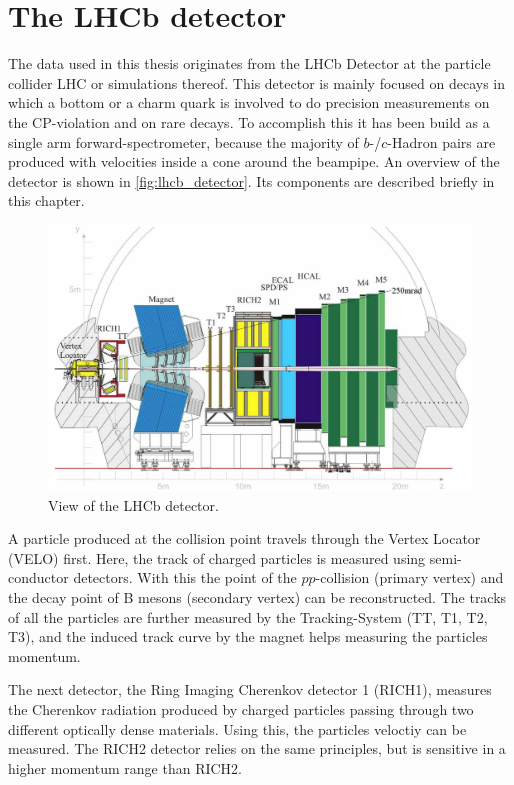 \section{The LHCb detector}

The data used in this thesis originates from the LHCb Detector at the particle collider LHC or simulations thereof.
This detector is mainly focused on decays in which a bottom or a charm quark is involved to do precision measurements on the CP-violation and on rare decays. 
To accomplish this it has been build as a single arm forward-spectrometer, because the majority of $b$-/$c$-Hadron pairs are produced with velocities inside a cone around the beampipe.
An overview of the detector is shown in \autoref{fig:lhcb_detector}.
Its components are described briefly in this chapter.

\begin{figure}
    \centering
    \includegraphics[width=\textwidth]{images/lhcb_detector.png}
    \caption{View of the LHCb detector. \cite{lhcb_detector}}
    \label{fig:lhcb_detector}
\end{figure}

A particle produced at the collision point travels through the Vertex Locator (VELO) first. 
Here, the track of charged particles is measured using semi-conductor detectors. 
With this the point of the $pp$-collision (primary vertex) and the decay point of B mesons (secondary vertex) can be reconstructed.
The tracks of all the particles are further measured by the Tracking-System (TT, T1, T2, T3), and the induced track curve by the magnet helps measuring the particles momentum.

The next detector, the Ring Imaging Cherenkov detector 1 (RICH1), measures the Cherenkov radiation produced by charged particles passing through two different optically dense materials. 
Using this, the particles veloctiy can be measured. The RICH2 detector relies on the same principles, but is sensitive in a higher momentum range than RICH2.

